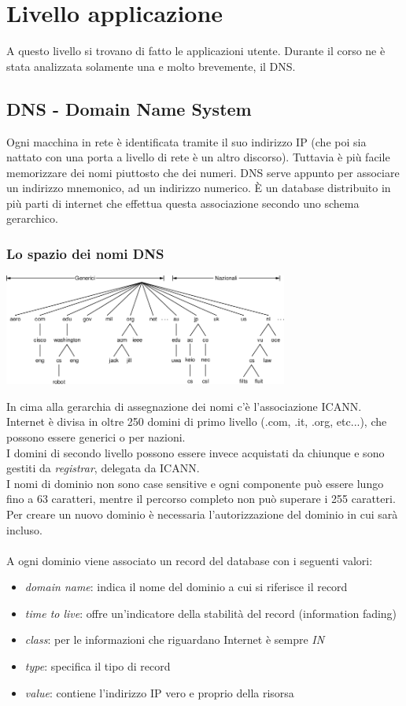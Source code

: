 \documentclass[10pt,a4paper,twoside]{article}
\begin{document}
\section{Livello applicazione}
A questo livello si trovano di fatto le applicazioni utente. Durante il corso ne è stata analizzata solamente una e molto brevemente, il DNS.

\subsection{DNS - Domain Name System}
Ogni macchina in rete è identificata tramite il suo indirizzo IP (che poi sia nattato con una porta a livello di rete è un altro discorso). Tuttavia è più facile memorizzare dei nomi piuttosto che dei numeri. DNS serve appunto per associare un indirizzo mnemonico, ad un indirizzo numerico. È un database distribuito in più parti di internet che effettua questa associazione secondo uno schema gerarchico.

\subsubsection{Lo spazio dei nomi DNS}
\begin{center}
\includegraphics[width=0.7\textwidth]{images/dns.png}
\end{center}
In cima alla gerarchia di assegnazione dei nomi c'è l'associazione ICANN. Internet è divisa in oltre 250 domini di primo livello (.com, .it, .org, etc...), che possono essere generici o per nazioni.\\
I domini di secondo livello possono essere invece acquistati da chiunque e sono gestiti da \textit{registrar}, delegata da ICANN.\\
I nomi di dominio non sono case sensitive e ogni componente può essere lungo fino a 63 caratteri, mentre il percorso completo non può superare i 255 caratteri. Per creare un nuovo dominio è necessaria l'autorizzazione del dominio in cui sarà incluso.\\\\
A ogni dominio viene associato un record del database con i seguenti valori:
\begin{itemize}
\item \textit{domain name}: indica il nome del dominio a cui si riferisce il record
\item \textit{time to live}: offre un'indicatore della stabilità del record (information fading)
\item \textit{class}: per le informazioni che riguardano Internet è sempre \textit{IN}
\item \textit{type}: specifica il tipo di record
\item \textit{value}: contiene l'indirizzo IP vero e proprio della risorsa
\end{itemize}
\end{document}
